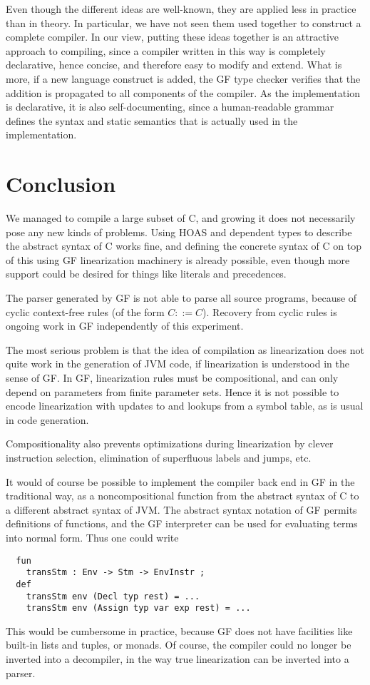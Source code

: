 \documentclass[12pt]{article}
\begin{document}
Even though the different ideas are well-known, they are
applied less in practice than in theory. In particular,
we have not seen them used together to construct a complete
compiler. In our view, putting these ideas together is
an attractive approach to compiling, since a compiler written
in this way is completely declarative, hence concise, 
and therefore easy to modify and extend. What is more, if
a new language construct is added, the GF type checker
verifies that the addition is propagated to all components
of the compiler. As the implementation is declarative, 
it is also self-documenting, since a human-readable 
grammar defines the syntax and static
semantics that is actually used in the implementation.


\section{Conclusion}

We managed to compile a large subset of C, and growing it
does not necessarily pose any new kinds of problems. 
Using HOAS and dependent types to describe the abstract
syntax of C works fine, and defining the concrete syntax
of C on top of this using GF linearization machinery is 
already possible, even though more support could be
desired for things like literals and precedences.

The parser generated by GF is not able to parse all
source programs, because of cyclic context-free
rules (of the form $C ::= C$). Recovery from cyclic
rules is ongoing work in GF independently of this
experiment.

The most serious problem is that the idea of compilation
as linearization does not quite work in the generation
of JVM code, if linearization is understood in the
sense of GF. In GF, linearization rules must be
compositional, and can only depend on parameters from
finite parameter sets. Hence it is not possible to encode
linearization with updates to and lookups from a symbol table,
as is usual in code generation. 

Compositionality also prevents optimizations during linearization
by clever instruction selection, elimination of superfluous
labels and jumps, etc.

It would of course be possible to implement the compiler
back end in GF in the traditional way, as a noncompositional
function from the abstract syntax of C to a different abstract
syntax of JVM. The abstract syntax notation of GF permits
definitions of functions, and the GF interpreter can be used
for evaluating terms into normal form. Thus one could write
\begin{verbatim}
  fun 
    transStm : Env -> Stm -> EnvInstr ;
  def
    transStm env (Decl typ rest) = ... 
    transStm env (Assign typ var exp rest) = ... 
\end{verbatim}
This would be cumbersome in practice, because
GF does not have facilities like built-in lists and tuples, 
or monads. Of course, the compiler could no longer be
inverted into a decompiler, in the way true linearization
can be inverted into a parser.
\end{document}

